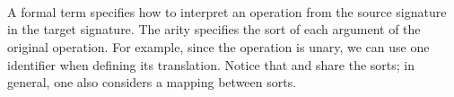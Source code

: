 \begin{code}
\>[0][@{}l@{\AgdaIndent{0}}]%
\>[1]\AgdaSpace{}%
%
\>[11]\AgdaSymbol{(}\AgdaSpace{}%
\AgdaSymbol{:}\AgdaSpace{}%
\AgdaSpace{}%
\AgdaSymbol{)}\AgdaSpace{}%
\AgdaSymbol{:}\AgdaSpace{}%
\AgdaSymbol{(}\AgdaSpace{}%
\AgdaSymbol{)}\AgdaSpace{}%
\AgdaSpace{}%
\AgdaSpace{}%
\<%
\\
\>[1][@{}l@{\AgdaIndent{0}}]%
\>[3]\AgdaInductiveConstructor{\#}%
\>[7]\AgdaSymbol{:}\AgdaSpace{}%
\AgdaSymbol{(}\AgdaSpace{}%
\AgdaSymbol{:}\AgdaSpace{}%
\AgdaSpace{}%
\AgdaSymbol{(}\AgdaSpace{}%
\AgdaSymbol{))}\AgdaSpace{}%
\AgdaSpace{}%
\AgdaSpace{}%
\AgdaSpace{}%
\AgdaSymbol{(}\AgdaSpace{}%
\AgdaSpace{}%
\AgdaSymbol{)}\<%
\\
%
\>[3]\AgdaSpace{}%
\AgdaSymbol{:}\AgdaSpace{}%
%
\>[113I]\AgdaSymbol{\{}\AgdaSpace{}%
\AgdaSymbol{\}}\AgdaSpace{}%
\AgdaSpace{}%
\AgdaSpace{}%
\AgdaSpace{}%
\AgdaSymbol{(}\AgdaSpace{}%
\AgdaOperator{\AgdaInductiveConstructor{,}}\AgdaSpace{}%
\AgdaSymbol{)}\AgdaSpace{}%
\<%
\\
\>[113I][@{}l@{\AgdaIndent{0}}]%
\>[15]\AgdaSpace{}%
\AgdaSymbol{(}\AgdaSpace{}%
\AgdaSymbol{)}\AgdaSpace{}%
\AgdaSpace{}%
\AgdaSpace{}%
\AgdaSpace{}%
\AgdaSpace{}%
\<%
\end{code}

A formal term specifies how to interpret an operation from the source
signature in the target signature. The arity  specifies the sort
of each argument of the original operation. For example, since the
operation  is unary, we can use one identifier when defining its
translation. Notice that  and  share the sorts; in
general, one also considers a mapping between sorts.

